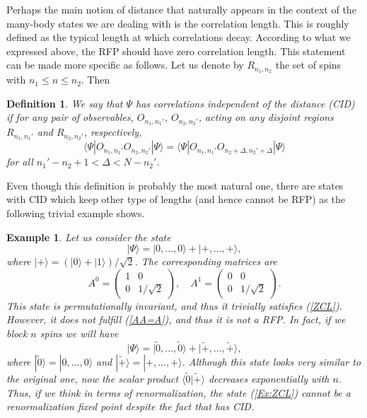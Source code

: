 \documentclass{elsarticle}
\newcommand{\be}{\begin{equation}}
\newcommand{\ee}{\end{equation}}
\newtheorem{defn}[thm]{Definition}
\newtheorem{ex}[thm]{Example}
\begin{document}
Perhaps the main notion of distance that naturally appears in the context of the many-body states we are dealing with is the correlation length. This is roughly defined as the typical length at which correlations decay. According to what we expressed above, the RFP should have zero correlation length. This statement can be made more specific as follows. Let us denote by $R_{n_1,n_2}$ the set of spins with $n_1\le n\le n_2$. Then
\begin{defn}
We say that $\Psi$ has {\em correlations independent of the distance} (CID) if for any pair of observables, $O_{n_1,n_1'}$, $O_{n_2,n_2'}$, acting on any disjoint regions $R_{n_1,n_1'}$ and $R_{n_2,n_2'}$, respectively,
 \be
 \label{ZCL}
 \langle \Psi| O_{n_1,n_1'}O_{n_2,n_2'}|\Psi\rangle =
 \langle \Psi| O_{n_1,n_1'}O_{n_2+\Delta,n_2'+\Delta}|\Psi\rangle
 \ee
for all $n_1'-n_2+1 < \Delta < N-n_2'$.
\end{defn}

Even though this definition is probably the most natural one, there are states with CID which keep other type of lengths (and hence cannot be RFP) as the following trivial example shows.

\begin{ex}
Let us consider the state
 \be
 \label{Ex:ZCL}
 |\Psi\rangle = |0,\ldots,0\rangle + |+,\ldots,+\rangle,
 \ee
where $|+\rangle=(|0\rangle+|1\rangle)/\sqrt{2}$. The corresponding matrices are
 \be
 A^0=\left( \begin{array}{cc} 1 & 0 \\ 0 & 1/\sqrt{2} \end{array}\right), \quad A^1=\left( \begin{array}{cc} 0 & 0 \\ 0 & 1/\sqrt{2} \end{array}\right).
 \ee
This state is permutationally invariant, and thus it trivially satisfies (\ref{ZCL}). However, it does not fulfill (\ref{AA=A}), and thus it is not a RFP. In fact, if we block $n$ spins we will have
 \be
 |\Psi\rangle = |\tilde 0,\ldots,\tilde 0\rangle + |\tilde +,\ldots,\tilde +\rangle,
 \ee
where $|\tilde 0\rangle=|0,\ldots,0\rangle$ and $|\tilde +\rangle= |+,\ldots,+\rangle$. Although this state looks very similar to the original one, now the scalar product $\langle \tilde 0|\tilde +\rangle$ decreases exponentially with $n$. Thus, if we think in terms of renormalization, the state (\ref{Ex:ZCL}) cannot be a renormalization fixed point despite the fact that has CID.
\end{ex}
\end{document}
